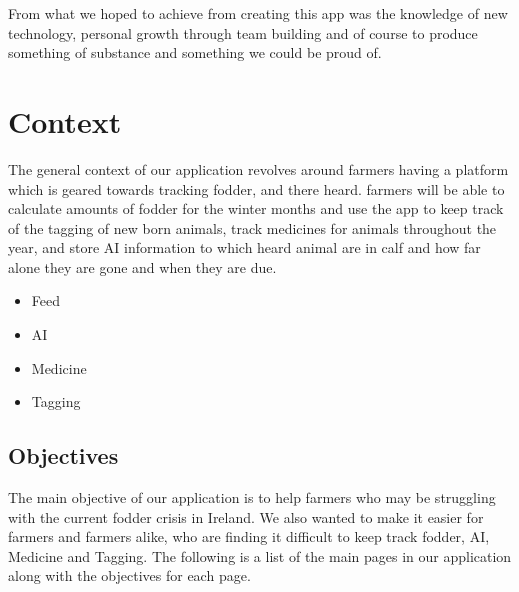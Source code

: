 \documentclass[12pt,a4paper,oneside,openany]{book}
\begin{document}
From what we hoped to achieve from creating this app was the knowledge of new technology, personal growth through team building and of course to produce something of substance and something we could be proud of.

\chapter{Context}

The general context of our application revolves around farmers having a platform which is geared towards tracking fodder, and there heard. farmers will be able to calculate amounts of fodder for the winter months and use the app to keep track of the tagging of new born animals, track medicines for animals throughout the year, and store AI information to which heard animal are in calf and how far alone they are gone and when they are due.


\begin{itemize}
	  \item Feed
	  \item AI
	  \item Medicine 
	  \item Tagging
	\end{itemize}


\section{Objectives} \label{objectives}
The main objective of our application is to help farmers who may be struggling with the current fodder crisis in Ireland. We also wanted to make it easier for farmers and farmers alike, who are finding it difficult to keep track fodder, AI, Medicine and Tagging. The following is a list of the main pages in our application along with the objectives for each page. 
\end{document}
